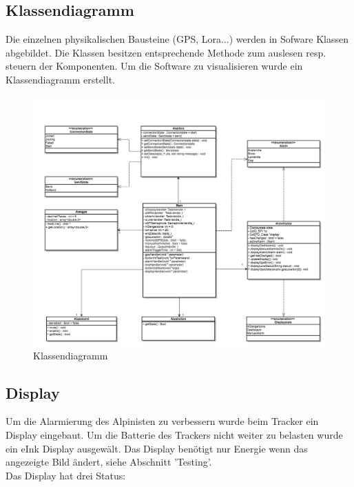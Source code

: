 \documentclass[11pt,english,german]{report}
\theoremstyle{definition}
\begin{document}
\newpage
\subsection{Klassendiagramm}
Die einzelnen physikalischen Bausteine (GPS, Lora...) werden in Sofware Klassen abgebildet. Die Klassen besitzen entsprechende Methode zum auslesen resp. steuern der Komponenten. Um die Software zu visualisieren wurde ein Klassendiagramm erstellt.
\begin{figure}[H]
	\centering
	\includegraphics[width=\textwidth]{img/prototype/classdiagram.jpg}
	\caption[Klassendiagramm]
	{Klassendiagramm}
\end{figure}

\newpage
\subsection{Display}
Um die Alarmierung des Alpinisten zu verbessern wurde beim Tracker ein Display eingebaut. Um die Batterie des Trackers nicht weiter zu belasten wurde ein eInk Display ausgewält. Das Display benötigt nur Energie wenn das angezeigte Bild ändert, siehe Abschnitt 'Testing'.\\[0.3cm]
Das Display hat drei Status:
\end{document}
